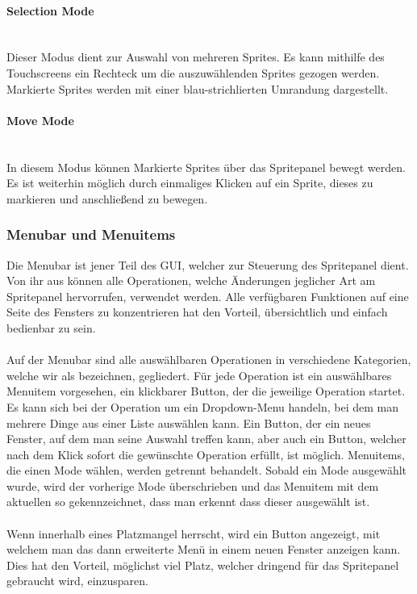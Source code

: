 \paragraph{Selection Mode}\ \\
Dieser Modus dient zur Auswahl von mehreren Sprites. Es kann mithilfe des Touchscreens ein Rechteck um die auszuwählenden Sprites gezogen werden. Markierte Sprites werden mit einer blau-strichlierten Umrandung dargestellt.
\paragraph{Move Mode}\ \\
In diesem Modus können Markierte Sprites über das Spritepanel bewegt werden. Es ist weiterhin möglich durch einmaliges Klicken auf ein Sprite, dieses zu markieren und anschließend zu bewegen.

\subsubsection{Menubar und Menuitems}

Die Menubar ist jener Teil des GUI, welcher zur Steuerung des Spritepanel dient. Von ihr aus können alle Operationen, welche Änderungen jeglicher Art am Spritepanel hervorrufen, verwendet werden. Alle verfügbaren Funktionen auf eine Seite des Fensters zu konzentrieren hat den Vorteil, übersichtlich und einfach bedienbar zu sein.\\
\\
Auf der Menubar sind alle auswählbaren Operationen in verschiedene Kategorien, welche wir als  bezeichnen, gegliedert. Für jede Operation ist ein auswählbares Menuitem vorgesehen, ein klickbarer Button, der die jeweilige Operation startet. Es kann sich bei der Operation um ein Dropdown-Menu handeln, bei dem man mehrere Dinge aus einer Liste auswählen kann. Ein Button, der ein neues Fenster, auf dem man seine Auswahl treffen kann, aber auch ein Button, welcher nach dem Klick sofort die gewünschte Operation erfüllt, ist möglich. Menuitems, die einen Mode wählen, werden getrennt behandelt. Sobald ein Mode ausgewählt wurde, wird der vorherige Mode überschrieben und das Menuitem mit dem aktuellen so gekennzeichnet, dass man erkennt dass dieser ausgewählt ist.\\
\\
Wenn innerhalb eines  Platzmangel herrscht, wird ein Button angezeigt, mit welchem man das dann erweiterte Menü in einem neuen Fenster anzeigen kann. Dies hat den Vorteil, möglichst viel Platz, welcher dringend für das Spritepanel gebraucht wird, einzusparen.

